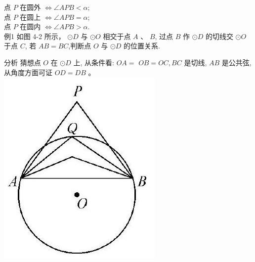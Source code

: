 \documentclass[10pt]{article}
\begin{document}
点 $P$ 在圆外 $\Leftrightarrow \angle A P B<\alpha ;$\\
点 $P$ 在圆上 $\Leftrightarrow \angle A P B=\alpha$;\\
点 $P$ 在圆内 $\Leftrightarrow \angle A P B>\alpha$.\\
例1 如图 4-2 所示， $\odot D$ 与 $\odot O$ 相交于点 $A$ 、 $B$, 过点 $B$ 作 $\odot D$ 的切线交 $\odot O$ 于点 $C$, 若 $A B=B C$,判断点 $O$ 与 $\odot D$ 的位置关系.

分析 猜想点 $O$ 在 $\odot D$ 上, 从条件看: $O A=$ $O B=O C, B C$ 是切线, $A B$ 是公共弦, 从角度方面可证 $O D=D B$ 。\\
\includegraphics[max width=\textwidth, center]{2024_10_30_66b8e5e701da2093c133g-029(1)}
\end{document}
